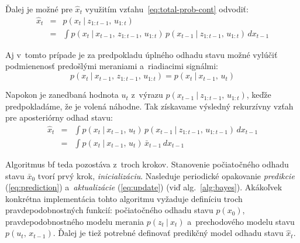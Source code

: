     Ďalej je možné pre $\hat{x}_t$ využitím vzťahu~\ref{eq:total-prob-cont} odvodiť:
    \begin{eqnarray}
      \hat{x}_t &=& p(x_t\ |\ z_{1:t-1},\, u_{1:t}) \\
                &=& \int p(x_t\ |\ x_{t-1},\, z_{1:t-1},\, u_{1:t})\, p(x_{t-1}\ |\ z_{1:t-1},\, u_{1:t})\, dx_{t-1}
    \end{eqnarray}

    Aj v~tomto prípade je za predpokladu úplného odhadu stavu možné vylúčiť podmienenosť predošlými meraniami a~riadiacimi signálmi:
    \begin{equation}
      p(x_t\ |\ x_{t-1},\, z_{1:t-1},\, u_{1:t}) = p(x_t\ |\ x_{t-1},\, u_t)
    \end{equation}
    
    Napokon je zanedbaná hodnota $u_t$ z~výrazu $p(x_{t-1}\ |\ z_{1:t-1},\, u_{1:t})$, keďže predpokladáme, že je volená náhodne. Tak získavame výsledný rekurzívny vzťah pre aposteriórny odhad stavu:
    \begin{eqnarray}
      \hat{x}_t &=& \int p(x_t\ |\ x_{t-1},\, u_t)\, p(x_{t-1}\ |\ z_{1:t-1},\, u_{1:t-1})\, dx_{t-1} \\
      &=& \int p(x_t\ |\ x_{t-1},\, u_t)\, \bar{x}_{t-1}\, dx_{t-1} \label{eq:prediction}
    \end{eqnarray}

    Algoritmus \acrshort{bf} teda pozostáva z~troch krokov. Stanovenie počiatočného odhadu stavu $\bar{x}_0$ tvorí prvý krok, \emph{inicializáciu}. Nasleduje periodické opakovanie \emph{predikcie} (\ref{eq:prediction}) a~\emph{aktualizácie} (\ref{eq:update}) (viď alg.~\ref{alg:bayes}). Akákoľvek konkrétna implementácia tohto algoritmu vyžaduje definíciu troch pravdepodobnostných funkcií: počiatočného odhadu stavu $p(x_0)$, pravdepodobnostného modelu merania $p(z_t\ |\ x_t)$ a~prechodového modelu stavu $p(u_t,\, x_{t-1})$. Ďalej je tiež potrebné definovať predikčný model odhadu stavu $\hat{x}_t$.

    \begin{algorithm}[t]
    \caption[Bayesov filter]{Bayesov filter podľa~\cite{thrunProbabilisticRobotics2005}}\label{alg:bayes}
    \begin{algorithmic}
      
        
      \ENDFOR{}
      
    \end{algorithmic}
    \end{algorithm}

